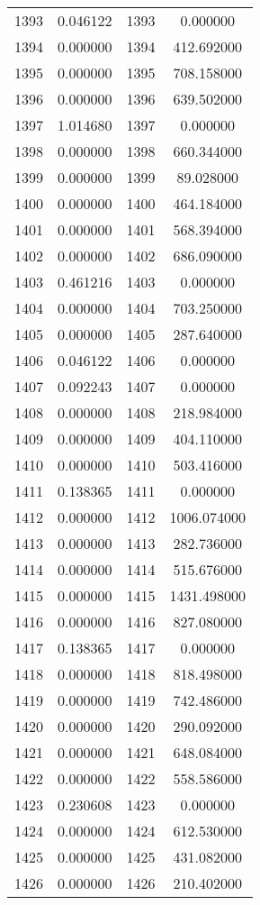 \documentclass[12pt]{article}
\begin{document}
\begin{longtable}{@{}cccc@{}}
1393 & 0.046122 & 1393 & 0.000000 \\
1394 & 0.000000 & 1394 & 412.692000 \\
1395 & 0.000000 & 1395 & 708.158000 \\
1396 & 0.000000 & 1396 & 639.502000 \\
1397 & 1.014680 & 1397 & 0.000000 \\
1398 & 0.000000 & 1398 & 660.344000 \\
1399 & 0.000000 & 1399 & 89.028000 \\
1400 & 0.000000 & 1400 & 464.184000 \\
1401 & 0.000000 & 1401 & 568.394000 \\
1402 & 0.000000 & 1402 & 686.090000 \\
1403 & 0.461216 & 1403 & 0.000000 \\
1404 & 0.000000 & 1404 & 703.250000 \\
1405 & 0.000000 & 1405 & 287.640000 \\
1406 & 0.046122 & 1406 & 0.000000 \\
1407 & 0.092243 & 1407 & 0.000000 \\
1408 & 0.000000 & 1408 & 218.984000 \\
1409 & 0.000000 & 1409 & 404.110000 \\
1410 & 0.000000 & 1410 & 503.416000 \\
1411 & 0.138365 & 1411 & 0.000000 \\
1412 & 0.000000 & 1412 & 1006.074000 \\
1413 & 0.000000 & 1413 & 282.736000 \\
1414 & 0.000000 & 1414 & 515.676000 \\
1415 & 0.000000 & 1415 & 1431.498000 \\
1416 & 0.000000 & 1416 & 827.080000 \\
1417 & 0.138365 & 1417 & 0.000000 \\
1418 & 0.000000 & 1418 & 818.498000 \\
1419 & 0.000000 & 1419 & 742.486000 \\
1420 & 0.000000 & 1420 & 290.092000 \\
1421 & 0.000000 & 1421 & 648.084000 \\
1422 & 0.000000 & 1422 & 558.586000 \\
1423 & 0.230608 & 1423 & 0.000000 \\
1424 & 0.000000 & 1424 & 612.530000 \\
1425 & 0.000000 & 1425 & 431.082000 \\
1426 & 0.000000 & 1426 & 210.402000 \\

\end{longtable}
\end{document}

